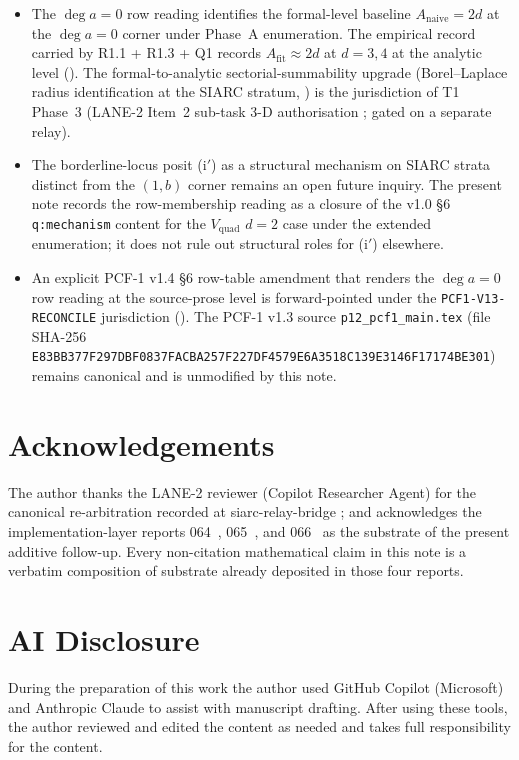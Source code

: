 \documentclass[11pt,reqno]{amsart}
\theoremstyle{plain}
\theoremstyle{definition}
\theoremstyle{remark}
\newcommand{\Anaive}{A_{\mathrm{naive}}}
\newcommand{\Afit}{A_{\mathrm{fit}}}
\newcommand{\dega}{\deg a}
\newcommand{\Vquad}{V_{\mathrm{quad}}}
\begin{document}
\begin{itemize}[leftmargin=2.2em]
\item The $\dega = 0$ row reading identifies the formal-level
  baseline $\Anaive = 2d$ at the $\dega = 0$ corner under
  Phase~A enumeration. The empirical record carried by
  \cite{papanokechi_pcf2_v13} R1.1 + R1.3 + Q1 records
  $\Afit \approx 2d$ at $d = 3, 4$ at the analytic level
  (\cite[\S 4.1]{bt_baseline_note_v10}). The
  formal-to-analytic sectorial-summability upgrade
  (Borel--Laplace radius identification at the SIARC stratum,
  \cite[ch.~5]{costin2008asymptotics_followup}) is the
  jurisdiction of T1 Phase~3 (LANE-2 Item~2 sub-task 3-D
  authorisation \cite[Item~2, sub-task 3-D]%
  {lane2_six_item_verdict}; gated on a separate relay).
\item The borderline-locus posit \textup{(i$'$)} as a
  structural mechanism on SIARC strata distinct from the
  $(1, b)$ corner remains an open future inquiry. The present
  note records the row-membership reading as a closure of the
  v1.0 \S 6 \texttt{q:mechanism} content for the $\Vquad$
  $d = 2$ case under the extended enumeration; it does not
  rule out structural roles for \textup{(i$'$)} elsewhere.
\item An explicit PCF-1 v1.4 \S 6 row-table amendment that
  renders the $\dega = 0$ row reading at the source-prose
  level is forward-pointed under the
  \texttt{PCF1-V13-RECONCILE} jurisdiction
  (\cite[\S 6]{pcf1_v13_v_quad_row_reframing_066}). The
  PCF-1 v1.3 source \texttt{p12\_pcf1\_main.tex} (file
  SHA-256
  \verb|E83BB377F297DBF0837FACBA257F227DF4579E6A3518C139E3146F17174BE301|)
  remains canonical and is unmodified by this note.
\end{itemize}

\section*{Acknowledgements}

The author thanks the LANE-2 reviewer (Copilot Researcher
Agent) for the canonical re-arbitration recorded at
siarc-relay-bridge \cite{lane2_dee3c01}; and acknowledges the
implementation-layer reports 064~\cite{phase_a_deg_a_zero_064},
065~\cite{cf_value_audit_pcf2_9impls_065}, and
066~\cite{pcf1_v13_v_quad_row_reframing_066} as the substrate
of the present additive follow-up. Every non-citation
mathematical claim in this note is a verbatim composition of
substrate already deposited in those four reports.

\section*{AI Disclosure}

During the preparation of this work the author used GitHub
Copilot (Microsoft) and Anthropic Claude to assist with
manuscript drafting. After using these tools, the author
reviewed and edited the content as needed and takes full
responsibility for the content.



\end{document}

